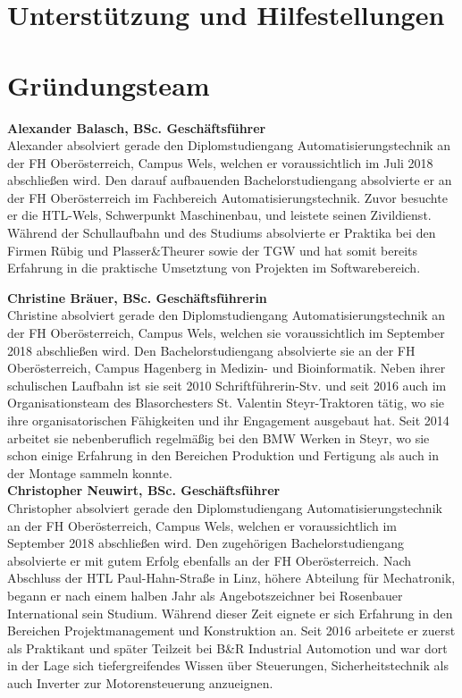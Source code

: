 \section{Unterstützung und Hilfestellungen}

\section{Gründungsteam}
\textbf{Alexander Balasch, BSc. Geschäftsführer} \\
Alexander absolviert gerade den Diplomstudiengang Automatisierungstechnik an der FH Oberösterreich, Campus Wels, welchen er voraussichtlich im Juli 2018 abschließen wird. Den darauf aufbauenden Bachelorstudiengang absolvierte er an der FH Oberösterreich im Fachbereich Automatisierungstechnik. Zuvor besuchte er die HTL-Wels, Schwerpunkt Maschinenbau, und leistete seinen Zivildienst. Während der Schullaufbahn und des Studiums absolvierte er Praktika bei den Firmen Rübig und Plasser\&Theurer sowie der TGW und hat somit bereits Erfahrung in die praktische Umsetztung von Projekten im Softwarebereich. 

\textbf{Christine Bräuer, BSc. Geschäftsführerin} \\
Christine absolviert gerade den Diplomstudiengang Automatisierungstechnik an der FH Oberösterreich, Campus Wels, welchen sie voraussichtlich im September 2018 abschließen wird. Den Bachelorstudiengang absolvierte sie an der FH Oberösterreich, Campus Hagenberg in Medizin- und Bioinformatik. 
Neben ihrer schulischen Laufbahn ist sie seit 2010 Schriftführerin-Stv. und seit 2016 auch im Organisationsteam des Blasorchesters St. Valentin Steyr-Traktoren tätig, wo sie ihre organisatorischen Fähigkeiten und ihr Engagement ausgebaut hat. Seit 2014 arbeitet sie nebenberuflich regelmäßig bei den BMW Werken in Steyr, wo sie schon einige Erfahrung in den Bereichen Produktion und Fertigung als auch in der Montage sammeln konnte. \\

\textbf{Christopher Neuwirt, BSc. Geschäftsführer} \\
Christopher absolviert gerade den Diplomstudiengang Automatisierungstechnik an der FH Oberösterreich, Campus Wels, welchen er voraussichtlich im September 2018 abschließen wird. Den zugehörigen Bachelorstudiengang absolvierte er mit gutem Erfolg ebenfalls an der FH Oberösterreich. Nach Abschluss der HTL Paul-Hahn-Straße in Linz, höhere Abteilung für Mechatronik, begann er nach einem halben Jahr als Angebotszeichner bei Rosenbauer International sein Studium. Während dieser Zeit eignete er sich Erfahrung in den Bereichen Projektmanagement und Konstruktion an. Seit 2016 arbeitete er zuerst als Praktikant und später Teilzeit bei B\&R Industrial Automotion und war dort in der Lage sich tiefergreifendes Wissen über Steuerungen, Sicherheitstechnik als auch Inverter zur Motorensteuerung anzueignen.\\

